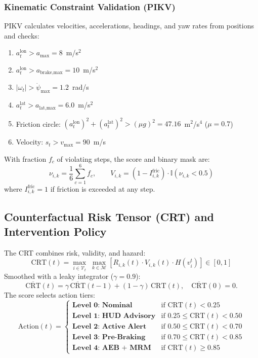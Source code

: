 \documentclass[preprint,12pt]{elsarticle}
\begin{document}
\subsubsection{Kinematic Constraint Validation (PIKV)}
PIKV calculates velocities, accelerations, headings, and yaw rates from positions and checks:
\begin{enumerate}
    \item $a^{\text{lon}}_t > a_{\max} = 8$~m/s$^2$
    \item $a^{\text{lon}}_t > a_{\text{brake,max}} = 10$~m/s$^2$
    \item $|\omega_t| > \dot{\psi}_{\max} = 1.2$~rad/s
    \item $a^{\text{lat}}_t > a_{\text{lat,max}} = 6.0$~m/s$^2$
    \item Friction circle: $(a^{\text{lon}}_t)^2 + (a^{\text{lat}}_t)^2 > (\mu g)^2 = 47.16$~m$^2$/s$^4$ ($\mu = 0.7$)
    \item Velocity: $s_t > v_{\max} = 90$~m/s
\end{enumerate}
With fraction $f_c$ of violating steps, the score and binary mask are:
\begin{equation}
    \nu_{i,k} = \frac{1}{6} \sum_{c=1}^{6} f_c, \qquad
    V_{i,k} = (1 - I^{\text{fric}}_{i,k}) \cdot \mathbb{I}(\nu_{i,k} < 0.5)
    \label{eq_validity}
\end{equation}
where $I^{\text{fric}}_{i,k} = 1$ if friction is exceeded at any step.

\subsection{Counterfactual Risk Tensor (CRT) and Intervention Policy}
The CRT combines risk, validity, and hazard:
\begin{equation}
    \text{CRT}(t) = \max_{i \in \mathcal{V}_t} \; \max_{k \in \mathcal{M}} \left[R_{i,k}(t) \cdot V_{i,k}(t) \cdot H(v_i^t)\right] \in [0, 1]
    \label{eq_crt}
\end{equation}
Smoothed with a leaky integrator ($\gamma=0.9$):
\begin{equation}
    \overline{\text{CRT}}(t) = \gamma \, \overline{\text{CRT}}(t-1) + (1 - \gamma) \, \text{CRT}(t), \quad \overline{\text{CRT}}(0) = 0.
    \label{eq_smooth}
\end{equation}
The score selects action tiers:
\begin{equation}
    \text{Action}(t) = \begin{cases}
    \textbf{Level 0: Nominal} & \text{if } \text{CRT}(t) < 0.25 \\
    \textbf{Level 1: HUD Advisory} & \text{if } 0.25 \le \text{CRT}(t) < 0.50 \\
    \textbf{Level 2: Active Alert} & \text{if } 0.50 \le \text{CRT}(t) < 0.70 \\
    \textbf{Level 3: Pre-Braking} & \text{if } 0.70 \le \text{CRT}(t) < 0.85 \\
    \textbf{Level 4: AEB + MRM} & \text{if } \text{CRT}(t) \ge 0.85
    \end{cases}
    \label{eq_intervention}
\end{equation}
\end{document}
